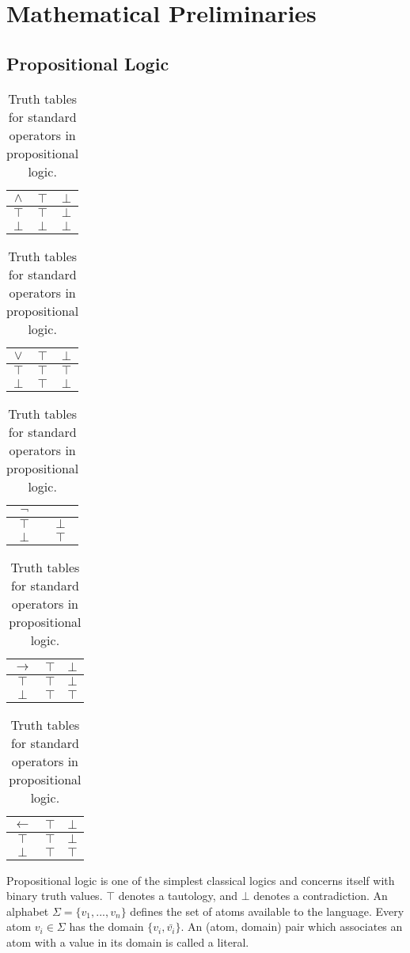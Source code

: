 \chapter{Mathematical Preliminaries}\label{chp:prelim} 
\section{Propositional Logic}\label{ssec:propLog}

\begin{table}
\begin{center}


\begin{tabular}{ c | c c }
  $\land$& $\top$ & $\bot$ \\ \hline
 $\top$ & $\top$ & $\bot$ \\  
 $\bot$ & $\bot$ &  $\bot$
\end{tabular}
\quad
\begin{tabular}{ c | c c }
  $\lor$& $\top$ & $\bot$ \\ \hline
 $\top$ & $\top$ & $\top$ \\  
 $\bot$ & $\top$ &  $\bot$
\end{tabular}
\quad
\begin{tabular}{ c | c }
  $\lnot$& \\ \hline
 $\top$ & $\bot$ \\  
 $\bot$ & $\top$
\end{tabular}

\begin{tabular}{ c | c c }
  $\rightarrow$& $\top$ & $\bot$ \\ \hline
 $\top$ & $\top$ & $\bot$ \\  
 $\bot$ & $\top$ &  $\top$
\end{tabular}
\quad
\begin{tabular}{ c | c c }
  $\leftarrow$& $\top$ & $\bot$ \\ \hline
 $\top$ & $\top$ & $\bot$ \\  
 $\bot$ & $\top$ &  $\top$
\end{tabular}

\caption{Truth tables for standard operators in propositional logic.}
\label{tbl:prop}

\end{center}
\end{table}

Propositional logic is one of the simplest classical logics and concerns itself with binary truth values. $\top$ denotes a tautology, and $\bot$ denotes a contradiction. An alphabet $\Sigma=\{v_1,...,v_n\}$ defines the set of atoms available to the language. Every atom $v_i \in \Sigma$ has the domain $\{v_i, \bar{v_i}\}$. An (atom, domain) pair which associates an atom with a value in its domain is called a literal.

